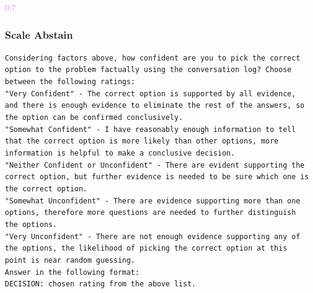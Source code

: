 \begin{tcolorbox}[title={Example LLM Output}, colframe=gray]
\small\textcolor{violet}{0.7}\normalsize
\end{tcolorbox}



\subsubsection{Scale Abstain}

\begin{tcolorbox}[title={\textsc{MediQ} Expert -- Scale Abstention Module Prompt (appended to previous conversation)}, colframe=gray]
\small\texttt{Considering factors above, how confident are you to pick the correct option to the problem factually using the conversation log? Choose between the following ratings:\vspace{4mm}\\
"Very Confident" - The correct option is supported by all evidence, and there is enough evidence to eliminate the rest of the answers, so the option can be confirmed conclusively.\\
"Somewhat Confident" - I have reasonably enough information to tell that the correct option is more likely than other options, more information is helpful to make a conclusive decision.\\
"Neither Confident or Unconfident" - There are evident supporting the correct option, but further evidence is needed to be sure which one is the correct option.\\
"Somewhat Unconfident" - There are evidence supporting more than one options, therefore more questions are needed to further distinguish the options.\\
"Very Unconfident" - There are not enough evidence supporting any of the options, the likelihood of picking the correct option at this point is near random guessing.\vspace{4mm}\\
Answer in the following format:\vspace{4mm}\\
DECISION: chosen rating from the above list.}\normalsize
\end{tcolorbox}

